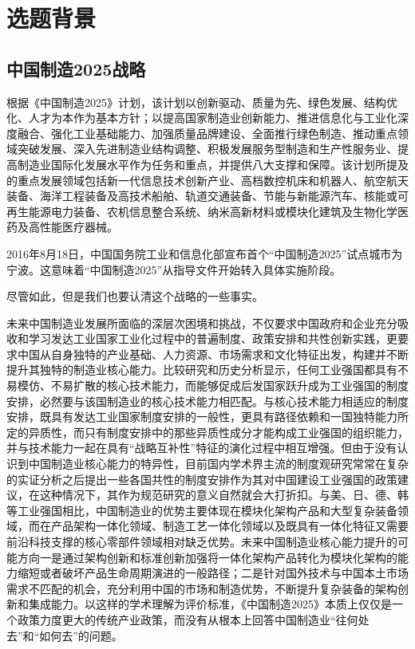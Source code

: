 \chapter{选题背景}
\label{chap:context}

\section{中国制造2025战略}

根据《中国制造2025》计划，该计划以创新驱动、质量为先、绿色发展、结构优化、人才为本作为基本方针；以提高国家制造业创新能力、推进信息化与工业化深度融合、强化工业基础能力、加强质量品牌建设、全面推行绿色制造、推动重点领域突破发展、深入先进制造业结构调整、积极发展服务型制造和生产性服务业、提高制造业国际化发展水平作为任务和重点，并提供八大支撑和保障。该计划所提及的重点发展领域包括新一代信息技术创新产业、高档数控机床和机器人、航空航天装备、海洋工程装备及高技术船舶、轨道交通装备、节能与新能源汽车、核能或可再生能源电力装备、农机信息整合系统、纳米高新材料或模块化建筑及生物化学医药及高性能医疗器械\cite{zhizao2025}。

2016年8月18日，中国国务院工业和信息化部宣布首个“中国制造2025”试点城市为宁波。这意味着“中国制造2025”从指导文件开始转入具体实施阶段\cite{hualuoningbo}。

尽管如此，但是我们也要认清这个战略的一些事实。

未来中国制造业发展所面临的深层次困境和挑战，不仅要求中国政府和企业充分吸收和学习发达工业国家工业化过程中的普遍制度、政策安排和共性创新实践，更要求中国从自身独特的产业基础、人力资源、市场需求和文化特征出发，构建并不断提升其独特的制造业核心能力。比较研究和历史分析显示，任何工业强国都具有不易模仿、不易扩散的核心技术能力，而能够促成后发国家跃升成为工业强国的制度安排，必然要与该国制造业的核心技术能力相匹配。与核心技术能力相适应的制度安排，既具有发达工业国家制度安排的一般性，更具有路径依赖和一国独特能力所定的异质性，而只有制度安排中的那些异质性成分才能构成工业强国的组织能力，并与技术能力一起在具有“战略互补性”特征的演化过程中相互增强。但由于没有认识到中国制造业核心能力的特异性，目前国内学术界主流的制度观研究常常在复杂的实证分析之后提出一些各国共性的制度安排作为其对中国建设工业强国的政策建议，在这种情况下，其作为规范研究的意义自然就会大打折扣。与美、日、德、韩等工业强国相比，中国制造业的优势主要体现在模块化架构产品和大型复杂装备领域，而在产品架构一体化领域、制造工艺一体化领域以及既具有一体化特征又需要前沿科技支撑的核心零部件领域相对缺乏优势。未来中国制造业核心能力提升的可能方向一是通过架构创新和标准创新加强将一体化架构产品转化为模块化架构的能力缩短或者破坏产品生命周期演进的一般路径；二是针对国外技术与中国本土市场需求不匹配的机会，充分利用中国的市场和制造优势，不断提升复杂装备的架构创新和集成能力。以这样的学术理解为评价标准，《中国制造2025》本质上仅仅是一个政策力度更大的传统产业政策，而没有从根本上回答中国制造业“往何处去”和“如何去”的问题\cite{jianping2025}。

